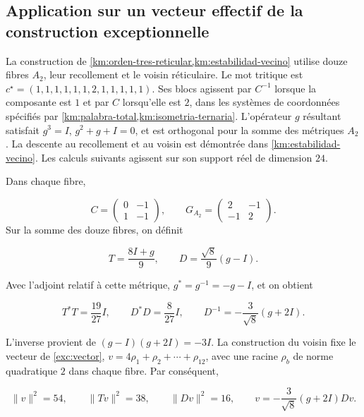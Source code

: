 \subsection{Application sur un vecteur effectif de la construction exceptionnelle
}

La construction de
\cref{km:orden-tres-reticular,km:estabilidad-vecino}
utilise douze fibres \(A_2\), leur recollement et le voisin réticulaire.
Le mot tritique est
\(c^\star=(1,1,1,1,1,1,2,1,1,1,1,1)\).
Ses blocs agissent par \(C^{-1}\) lorsque la composante est \(1\)
et par \(C\) lorsqu’elle est \(2\), dans les systèmes de coordonnées spécifiés par
\cref{km:palabra-total,km:isometria-ternaria}.
L’opérateur \(g\) résultant satisfait
\(g^3=I\), \(g^2+g+I=0\), et est orthogonal pour la somme des
métriques \(A_2\).
La descente au recollement et au voisin est démontrée dans
\cref{km:estabilidad-vecino}.
Les calculs suivants agissent sur son support réel de
dimension \(24\).

Dans chaque fibre,

\[
 C=\begin{pmatrix}0&-1\\1&-1\end{pmatrix},
 \qquad
 G_{A_2}=\begin{pmatrix}2&-1\\-1&2\end{pmatrix}.
\]
Sur la somme des douze fibres, on définit




\[
T=\frac{8I+g}{9},\qquad D=\frac{\sqrt8}{9}(g-I).
\]



Avec l’adjoint relatif à cette métrique,
\(g^*=g^{-1}=-g-I\), et on obtient




\begin{equation}
T^*T=\frac{19}{27}I,
\qquad D^*D=\frac8{27}I,
\qquad D^{-1}=-\frac3{\sqrt8}(g+2I).
\label{nuc11:eq:18}
\end{equation}



L’inverse provient de \((g-I)(g+2I)=-3I\).
La construction du voisin fixe le vecteur de
\eqref{exc:vector},
\(v=4\rho_1+\rho_2+\cdots+\rho_{12}\), avec une racine
\(\rho_b\) de norme quadratique \(2\) dans chaque fibre.
Par conséquent,




\begin{equation}
\|v\|^2=54,\qquad \|Tv\|^2=38,\qquad \|Dv\|^2=16,
\qquad v=-\frac3{\sqrt8}(g+2I)Dv.
\label{nuc11:eq:19}
\end{equation}



